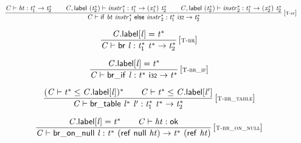 $$
\begin{array}{@{}c@{}}\displaystyle
\frac{
{\mathit{C}} \vdash {\mathit{bt}} : {{\mathit{t}}_{{1}}^\ast} \rightarrow {{\mathit{t}}_{{2}}^\ast}
 \qquad
{\mathit{C}}, \mathsf{label}~({{\mathit{t}}_{{2}}^\ast}) \vdash {{\mathit{instr}}_{{1}}^\ast} : {{\mathit{t}}_{{1}}^\ast} \rightarrow ({{\mathit{x}}_{{1}}^\ast})~{{\mathit{t}}_{{2}}^\ast}
 \qquad
{\mathit{C}}, \mathsf{label}~({{\mathit{t}}_{{2}}^\ast}) \vdash {{\mathit{instr}}_{{2}}^\ast} : {{\mathit{t}}_{{1}}^\ast} \rightarrow ({{\mathit{x}}_{{2}}^\ast})~{{\mathit{t}}_{{2}}^\ast}
}{
{\mathit{C}} \vdash \mathsf{if}~{\mathit{bt}}~{{\mathit{instr}}_{{1}}^\ast}~\mathsf{else}~{{\mathit{instr}}_{{2}}^\ast} : {{\mathit{t}}_{{1}}^\ast}~\mathsf{i{\scriptstyle32}} \rightarrow {{\mathit{t}}_{{2}}^\ast}
} \, {[\textsc{\scriptsize T{-}if}]}
\qquad
\end{array}
$$

\vspace{1ex}

$$
\begin{array}{@{}c@{}}\displaystyle
\frac{
{\mathit{C}}.\mathsf{label}{}[{\mathit{l}}] = {{\mathit{t}}^\ast}
}{
{\mathit{C}} \vdash \mathsf{br}~{\mathit{l}} : {{\mathit{t}}_{{1}}^\ast}~{{\mathit{t}}^\ast} \rightarrow {{\mathit{t}}_{{2}}^\ast}
} \, {[\textsc{\scriptsize T{-}br}]}
\qquad
\end{array}
$$

$$
\begin{array}{@{}c@{}}\displaystyle
\frac{
{\mathit{C}}.\mathsf{label}{}[{\mathit{l}}] = {{\mathit{t}}^\ast}
}{
{\mathit{C}} \vdash \mathsf{br\_if}~{\mathit{l}} : {{\mathit{t}}^\ast}~\mathsf{i{\scriptstyle32}} \rightarrow {{\mathit{t}}^\ast}
} \, {[\textsc{\scriptsize T{-}br\_if}]}
\qquad
\end{array}
$$

$$
\begin{array}{@{}c@{}}\displaystyle
\frac{
({\mathit{C}} \vdash {{\mathit{t}}^\ast} \leq {\mathit{C}}.\mathsf{label}{}[{\mathit{l}}])^\ast
 \qquad
{\mathit{C}} \vdash {{\mathit{t}}^\ast} \leq {\mathit{C}}.\mathsf{label}{}[{\mathit{l}'}]
}{
{\mathit{C}} \vdash \mathsf{br\_table}~{{\mathit{l}}^\ast}~{\mathit{l}'} : {{\mathit{t}}_{{1}}^\ast}~{{\mathit{t}}^\ast} \rightarrow {{\mathit{t}}_{{2}}^\ast}
} \, {[\textsc{\scriptsize T{-}br\_table}]}
\qquad
\end{array}
$$

$$
\begin{array}{@{}c@{}}\displaystyle
\frac{
{\mathit{C}}.\mathsf{label}{}[{\mathit{l}}] = {{\mathit{t}}^\ast}
 \qquad
{\mathit{C}} \vdash {\mathit{ht}} : \mathsf{ok}
}{
{\mathit{C}} \vdash \mathsf{br\_on\_null}~{\mathit{l}} : {{\mathit{t}}^\ast}~(\mathsf{ref}~\mathsf{null}~{\mathit{ht}}) \rightarrow {{\mathit{t}}^\ast}~(\mathsf{ref}~{\mathit{ht}})
} \, {[\textsc{\scriptsize T{-}br\_on\_null}]}
\qquad
\end{array}
$$


